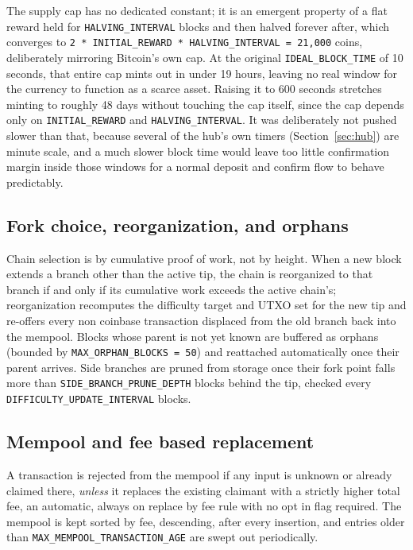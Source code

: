 \documentclass[11pt]{article}
\newcommand{\code}[1]{\texttt{#1}}
\begin{document}
The supply cap has no dedicated constant; it is an emergent property of a flat reward held for \code{HALVING_INTERVAL} blocks and then halved forever after, which converges to \code{2 * INITIAL_REWARD * HALVING_INTERVAL = 21{,}000} coins, deliberately mirroring Bitcoin's own cap. At the original \code{IDEAL_BLOCK_TIME} of 10 seconds, that entire cap mints out in under 19 hours, leaving no real window for the currency to function as a scarce asset. Raising it to 600 seconds stretches minting to roughly 48 days without touching the cap itself, since the cap depends only on \code{INITIAL_REWARD} and \code{HALVING_INTERVAL}. It was deliberately not pushed slower than that, because several of the hub's own timers (Section~\ref{sec:hub}) are minute scale, and a much slower block time would leave too little confirmation margin inside those windows for a normal deposit and confirm flow to behave predictably.

\subsection{Fork choice, reorganization, and orphans}
\label{sec:forkchoice}

Chain selection is by cumulative proof of work, not by height. When a new block extends a branch other than the active tip, the chain is reorganized to that branch if and only if its cumulative work exceeds the active chain's; reorganization recomputes the difficulty target and UTXO set for the new tip and re-offers every non coinbase transaction displaced from the old branch back into the mempool. Blocks whose parent is not yet known are buffered as orphans (bounded by \code{MAX_ORPHAN_BLOCKS = 50}) and reattached automatically once their parent arrives. Side branches are pruned from storage once their fork point falls more than \code{SIDE_BRANCH_PRUNE_DEPTH} blocks behind the tip, checked every \code{DIFFICULTY_UPDATE_INTERVAL} blocks.

\subsection{Mempool and fee based replacement}

A transaction is rejected from the mempool if any input is unknown or already claimed there, \emph{unless} it replaces the existing claimant with a strictly higher total fee, an automatic, always on replace by fee rule with no opt in flag required. The mempool is kept sorted by fee, descending, after every insertion, and entries older than \code{MAX_MEMPOOL_TRANSACTION_AGE} are swept out periodically.
\end{document}
